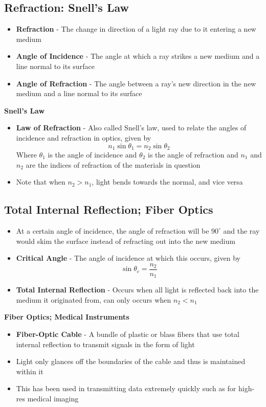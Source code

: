 \subsection{Refraction: Snell's Law}
\begin{itemize}
    \item \textbf{Refraction} - The change in direction of a light ray due to it entering a new medium
    \item \textbf{Angle of Incidence} - The angle at which a ray strikes a new medium and a line normal to its surface
    \item \textbf{Angle of Refraction} - The angle between a ray's new direction in the new medium and a line normal to its surface
\end{itemize}

\textbf{Snell's Law}
\begin{itemize}
    \item \textbf{Law of Refraction} - Also called Snell's law, used to relate the angles of incidence and refraction in optics, given by \[n_1\sin{\theta_1}=n_2\sin{\theta_2}\]
    Where \(\theta_1\) is the angle of incidence and \(\theta_2\) is the angle of refraction and \(n_1\) and \(n_2\) are the indices of refraction of the materials in question
    \item Note that when \(n_2>n_1\), light bends towards the normal, and vice versa
\end{itemize}


\subsection{Total Internal Reflection; Fiber Optics}
\begin{itemize}
    \item At a certain angle of incidence, the angle of refraction will be \(90^\circ\) and the ray would skim the surface instead of refracting out into the new medium
    \item \textbf{Critical Angle} - The angle of incidence at which this occurs, given by \[\sin{\theta_c}=\frac{n_2}{n_1}\]
    \item \textbf{Total Internal Reflection} - Occurs when all light is reflected back into the medium it originated from, can only occurs when \(n_2<n_1\)
\end{itemize}

\textbf{Fiber Optics; Medical Instruments}
\begin{itemize}
    \item \textbf{Fiber-Optic Cable} - A bundle of plastic or blass fibers that use total internal reflection to transmit signals in the form of light
    \item Light only glances off the boundaries of the cable and thus is maintained within it
    \item This has been used in transmitting data extremely quickly such as for high-res medical imaging
\end{itemize}

